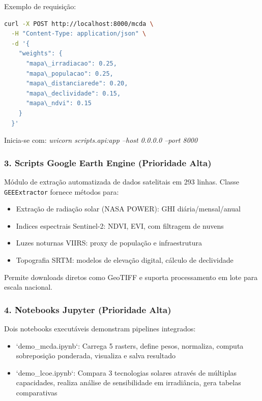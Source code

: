 \documentclass[12pt, a4paper]{article}
\begin{document}
Exemplo de requisição:
\begin{lstlisting}[language=bash]
curl -X POST http://localhost:8000/mcda \
  -H "Content-Type: application/json" \
  -d '{
    "weights": {
      "mapa\_irradiacao": 0.25,
      "mapa\_populacao": 0.25,
      "mapa\_distanciarede": 0.20,
      "mapa\_declividade": 0.15,
      "mapa\_ndvi": 0.15
    }
  }'
\end{lstlisting}

Inicia-se com: \textit{uvicorn scripts.api:app --host 0.0.0.0 --port 8000}

\subsubsection{3. Scripts Google Earth Engine (Prioridade Alta)}

Módulo de extração automatizada de dados satelitais em 293 linhas. Classe \texttt{GEEExtractor} fornece métodos para:

\begin{itemize}
    \item Extração de radiação solar (NASA POWER): GHI diária/mensal/anual
    \item Indices espectrais Sentinel-2: NDVI, EVI, com filtragem de nuvens
    \item Luzes noturnas VIIRS: proxy de população e infraestrutura
    \item Topografia SRTM: modelos de elevação digital, cálculo de declividade
\end{itemize}

Permite downloads diretos como GeoTIFF e suporta processamento em lote para escala nacional.

\subsubsection{4. Notebooks Jupyter (Prioridade Alta)}

Dois notebooks executáveis demonstram pipelines integrados:

\begin{itemize}
    \item `demo\_mcda.ipynb`: Carrega 5 rasters, define pesos, normaliza, computa sobreposição ponderada, visualiza e salva resultado
    \item `demo\_lcoe.ipynb`: Compara 3 tecnologias solares através de múltiplas capacidades, realiza análise de sensibilidade em irradiância, gera tabelas comparativas
\end{itemize}
\end{document}
